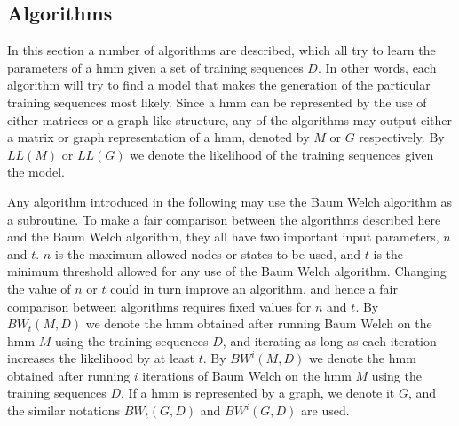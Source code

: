 \subsection{Algorithms}
In this section a number of algorithms are described, which all try to learn the parameters of a \gls{hmm} given a set of training sequences $D$.
In other words, each algorithm will try to find a model that makes the generation of the particular training sequences most likely.
Since a \gls{hmm} can be represented by the use of either matrices or a graph like structure, any of the algorithms may output either a matrix or graph representation of a \gls{hmm}, denoted by $M$ or $G$ respectively.
By $LL(M)$ or $LL(G)$ we denote the likelihood of the training sequences given the model.

Any algorithm introduced in the following may use the Baum Welch algorithm as a subroutine. 
To make a fair comparison between the algorithms described here and the Baum Welch algorithm, they all have two important input parameters, $n$ and $t$.
$n$ is the maximum allowed nodes or states to be used, and $t$ is the minimum threshold allowed for any use of the Baum Welch algorithm.
Changing the value of $n$ or $t$ could in turn improve an algorithm, and hence a fair comparison between algorithms requires fixed values for $n$ and $t$.
By $BW_t(M, D)$ we denote the \gls{hmm} obtained after running Baum Welch on the \gls{hmm} $M$ using the training sequences $D$, and iterating as long as each iteration increases the likelihood by at least $t$.
By $BW^i(M, D)$ we denote the \gls{hmm} obtained after running $i$ iterations of Baum Welch on the \gls{hmm} $M$ using the training sequences $D$.
If a \gls{hmm} is represented by a graph, we denote it $G$, and the similar notations $BW_t(G, D)$ and $BW^i(G, D)$ are used.



